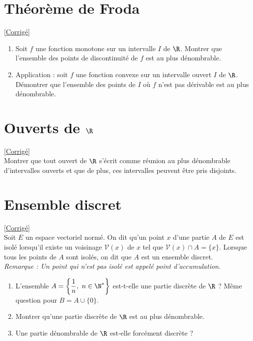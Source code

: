 \documentclass[8pt]{book}
\begin{document}
\section{Théorème de Froda }
\label{Théorème de Froda}
\textcolor{blue}{\hyperref[Théorème de Froda corrigé]{[Corrigé]}}\\
\begin{enumerate}[leftmargin=*]
	\item Soit $f$ une fonction monotone sur un intervalle $I$ de $\R$. Montrer que l'ensemble des points de discontinuité de $f$ est au plus dénombrable.
	\item Application : soit $f$ une fonction convexe sur un intervalle ouvert $I$ de $\R$.\\
	Démontrer que l'ensemble des points de $I$ où $f$ n'est pas dérivable est au plus dénombrable.
\end{enumerate}

\section{Ouverts de $\R$ }
\label{Ouverts de R}
\textcolor{blue}{\hyperref[Ouverts de R corrigé]{[Corrigé]}}\\
Montrer que tout ouvert de $\R$ s'écrit comme réunion au plus dénombrable d'intervalles ouverts et que de plus, ces intervalles peuvent être pris disjoints.

\section{Ensemble discret }
\label{Ensemble discret}
\textcolor{blue}{\hyperref[Ensemble discret corrigé]{[Corrigé]}}\\
Soit $E$ un espace vectoriel normé. On dit qu'un point $x$ d'une partie $A$ de $E$ est isolé lorsqu'il existe un voisinage $\mathcal V(x)$ de $x$ tel que $\mathcal V(x)\cap A=\{x\}$. Lorsque tous les points de $A$ sont isolés, on dit que $A$ est un ensemble discret.\\
\textit{Remarque : Un point qui n'est pas isolé est appelé point d'accumulation.}
\begin{enumerate}
	\item L'ensemble $A=\displaystyle\left\{\frac{1}{n},\ n\in \N^*\right\}$ est-t-elle une partie discrète de $\R$ ? Même question pour $B=A\cup\{0\}$.
	\item Montrer qu'une partie discrète de $\R$ est au plus dénombrable.
	\item Une partie dénombrable de $\R$ est-elle forcément discrète ?
\end{enumerate}
\end{document}
